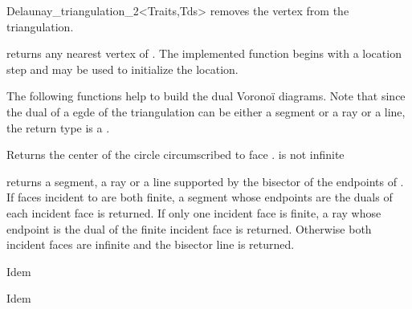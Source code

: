 \begin{ccClassTemplate} {Delaunay_triangulation_2<Traits,Tds>}
{removes the vertex from the triangulation.}



{returns any nearest vertex of . The implemented function
begins with a location step and
 may be used to initialize the location.}


The following functions help to build the dual Vorono\"i diagrams.
Note that since the dual of a egde of the triangulation can be either
a segment or a ray or a line, the return type is a \cgal {}.

{Returns the center of the circle circumscribed to face .
\ccPrecond {} is not infinite}

{returns a segment, a ray or a line supported by the bisector of the
endpoints of .
If faces incident to  are both finite, a segment whose endpoints are the
duals of each incident face is returned. If only one incident face is
finite, a
ray whose endpoint is the dual of the finite incident face is returned.
Otherwise both incident faces
are infinite and the bisector line is returned.}

{Idem}

{Idem}










\end{ccClassTemplate}
